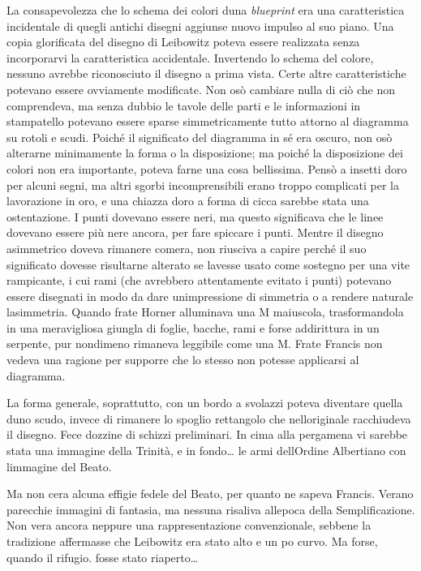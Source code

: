 La consapevolezza che lo schema dei colori d\textquotesingle una
\emph{blueprint} era una caratteristica incidentale di quegli antichi
disegni aggiunse nuovo impulso al suo piano. Una copia glorificata del
disegno di Leibowitz poteva essere realizzata senza incorporarvi la
caratteristica accidentale. Invertendo lo schema del colore, nessuno
avrebbe riconosciuto il disegno a prima vista. Certe altre
caratteristiche potevano essere ovviamente modificate. Non osò cambiare
nulla di ciò che non comprendeva, ma senza dubbio le tavole delle parti
e le informazioni in stampatello potevano essere sparse simmetricamente
tutto attorno al diagramma su rotoli e scudi. Poiché il significato del
diagramma in sé era oscuro, non osò alterarne minimamente la forma o la
disposizione; ma poiché la disposizione dei colori non era importante,
poteva farne una cosa bellissima. Pensò a insetti d\textquotesingle oro
per alcuni segni, ma altri sgorbi incomprensibili erano troppo
complicati per la lavorazione in oro, e una chiazza
d\textquotesingle oro a forma di cicca sarebbe stata una ostentazione. I
punti dovevano essere neri, ma questo significava che le linee dovevano
essere più nere ancora, per fare spiccare i punti. Mentre il disegno
asimmetrico doveva rimanere com\textquotesingle era, non riusciva a
capire perché il suo significato dovesse risultarne alterato se
l\textquotesingle avesse usato come sostegno per una vite rampicante, i
cui rami (che avrebbero attentamente evitato i punti) potevano essere
disegnati in modo da dare un\textquotesingle impressione di simmetria o
a rendere naturale l\textquotesingle asimmetria. Quando frate Horner
alluminava una M maiuscola, trasformandola in una meravigliosa giungla
di foglie, bacche, rami e forse addirittura in un serpente, pur
nondimeno rimaneva leggibile come una M. Frate Francis non vedeva una
ragione per supporre che lo stesso non potesse applicarsi al diagramma.

La forma generale, soprattutto, con un bordo a svolazzi poteva diventare
quella d\textquotesingle uno scudo, invece di rimanere lo spoglio
rettangolo che nell\textquotesingle originale racchiudeva il disegno.
Fece dozzine di schizzi preliminari. In cima alla pergamena vi sarebbe
stata una immagine della Trinità, e in fondo\ldots{} le armi
dell\textquotesingle Ordine Albertiano con l\textquotesingle immagine
del Beato.

Ma non c\textquotesingle era alcuna effigie fedele del Beato, per quanto
ne sapeva Francis. V\textquotesingle erano parecchie immagini di
fantasia, ma nessuna risaliva all\textquotesingle epoca della
Semplificazione. Non v\textquotesingle era ancora neppure una
rappresentazione convenzionale, sebbene la tradizione affermasse che
Leibowitz era stato alto e un po\textquotesingle{} curvo. Ma forse,
quando il rifugio. fosse stato riaperto\ldots{}

